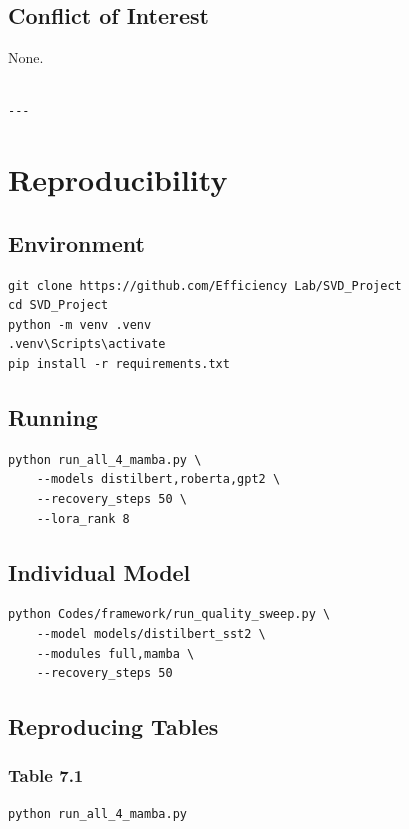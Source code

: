 \subsection{Conflict of Interest}

None.
\begin{lstlisting}

---
\end{lstlisting}

\section{Reproducibility}

\subsection{Environment}

\begin{lstlisting}
git clone https://github.com/Efficiency Lab/SVD_Project
cd SVD_Project
python -m venv .venv
.venv\Scripts\activate
pip install -r requirements.txt
\end{lstlisting}

\subsection{Running}

\begin{lstlisting}
python run_all_4_mamba.py \
    --models distilbert,roberta,gpt2 \
    --recovery_steps 50 \
    --lora_rank 8
\end{lstlisting}

\subsection{Individual Model}

\begin{lstlisting}
python Codes/framework/run_quality_sweep.py \
    --model models/distilbert_sst2 \
    --modules full,mamba \
    --recovery_steps 50
\end{lstlisting}

\subsection{Reproducing Tables}

\subsubsection{Table 7.1}
\begin{lstlisting}
python run_all_4_mamba.py
\end{lstlisting}


